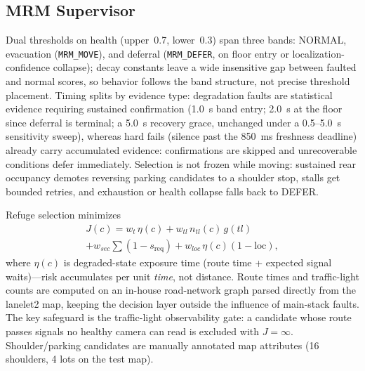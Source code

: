 \documentclass[letterpaper, 10pt, conference]{ieeeconf}
\begin{document}
\subsection{MRM Supervisor}
Dual thresholds on health (upper~0.7, lower~0.3) span three bands:
NORMAL, evacuation (\texttt{MRM\_MOVE}), and deferral
(\texttt{MRM\_DEFER}, on floor entry or localization-confidence collapse);
decay constants leave a wide insensitive gap between faulted and normal
scores, so behavior follows the band structure, not precise threshold
placement. Timing splits by evidence type: degradation faults are statistical
evidence requiring sustained confirmation (1.0~s band entry; 2.0~s at the
floor since deferral is terminal; a 5.0~s recovery grace, unchanged under a
0.5--5.0~s sensitivity sweep), whereas hard fails (silence past the 850~ms
freshness deadline) already carry accumulated evidence: confirmations are
skipped and unrecoverable conditions defer immediately. Selection is not frozen while moving: sustained rear occupancy demotes
reversing parking candidates to a shoulder stop, stalls get bounded
retries, and exhaustion or health collapse falls back to DEFER.

Refuge selection minimizes
\begin{multline}
J(c)=w_t\,\eta(c)+w_{tl}\,n_{tl}(c)\,g(tl)\\
 + w_{sec}\!\sum(1-s_{\mathrm{req}})+w_{loc}\,\eta(c)(1-\mathrm{loc}),
\end{multline}
where $\eta(c)$ is degraded-state exposure time (route time + expected
signal waits)---risk accumulates per unit \emph{time}, not distance. Route
times and traffic-light counts are computed on an in-house road-network
graph parsed directly from the lanelet2 map, keeping the decision layer
outside the influence of main-stack faults. The key safeguard is the
traffic-light observability gate: a candidate whose route passes signals no
healthy camera can read is excluded with $J=\infty$. Shoulder/parking
candidates are manually annotated map attributes (16 shoulders, 4 lots on
the test map).
\end{document}
